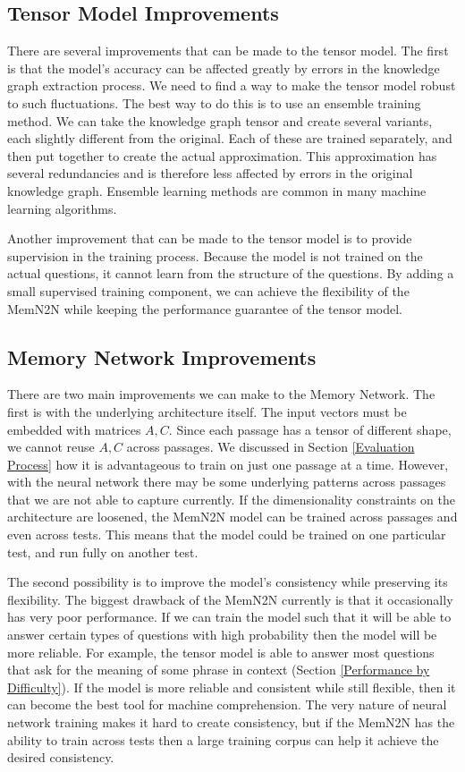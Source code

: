 \documentclass[pageno]{final_paper}
\begin{document}
\subsection{Tensor Model Improvements}
\label{Tensor Model Improvements}

There are several improvements that can be made to the tensor model. The first
is that the model's accuracy can be affected greatly by errors in the knowledge
graph extraction process. We need to find a way to make the tensor model robust
to such fluctuations. The best way to do this is to use an ensemble training
method. We can take the knowledge graph tensor and create several variants, each
slightly different from the original. Each of these are trained separately, and
then put together to create the actual approximation. This approximation has
several redundancies and is therefore less affected by errors in the original
knowledge graph. Ensemble learning methods are common in many machine learning
algorithms.

Another improvement that can be made to the tensor model is to provide
supervision in the training process. Because the model is not trained on the
actual questions, it cannot learn from the structure of the questions. By adding
a small supervised training component, we can achieve the flexibility of the
MemN2N while keeping the performance guarantee of the tensor model.

\subsection{Memory Network Improvements}
\label{Memory Network Improvements}

There are two main improvements we can make to the Memory Network. The first is
with the underlying architecture itself. The input vectors must be embedded with
matrices $A,C$. Since each passage has a tensor of different shape, we cannot
reuse $A,C$ across passages. We discussed in Section \ref{Evaluation Process}
how it is advantageous to train on just one passage at a time. However, with the
neural network there may be some underlying patterns across passages that we are
not able to capture currently. If the dimensionality constraints on the
architecture are loosened, the MemN2N model can be trained across passages and
even across tests. This means that the model could be trained on one particular
test, and run fully on another test.

The second possibility is to improve the model's consistency while preserving
its flexibility. The biggest drawback of the MemN2N currently is that it
occasionally has very poor performance. If we can train the model such that it
will be able to answer certain types of questions with high probability then the
model will be more reliable. For example, the tensor model is able to answer
most questions that ask for the meaning of some phrase in context (Section
\ref{Performance by Difficulty}). If the model is more reliable and consistent
while still flexible, then it can become the best tool for machine
comprehension. The very nature of neural network training makes it hard to
create consistency, but if the MemN2N has the ability to train across tests then
a large training corpus can help it achieve the desired consistency.
\end{document}
